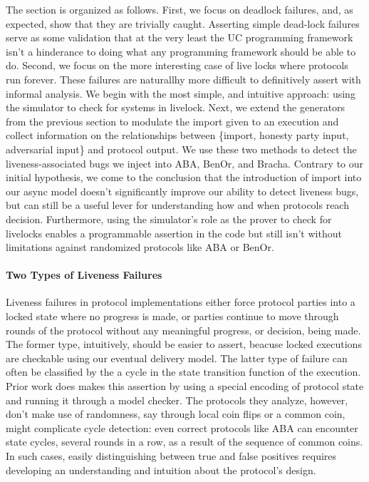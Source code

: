 The section is organized as follows.
First, we focus on deadlock failures, and, as expected, show that they are trivially caught. 
Asserting simple dead-lock failures serve as some validation that at the very least the UC programming framework isn't a hinderance to doing what any programming framework should be able to do.
Second, we focus on the more interesting case of live locks where protocols run forever.
These failures are naturallhy more difficult to definitively assert with informal analysis.
We begin with the most simple, and intuitive approach: using the simulator to check for systems in livelock.
Next, we extend the generators from the previous section to modulate the import given to an execution and collect information on the relationships between \{import, honesty party input, adversarial input\} and protocol output.
We use these two methods to detect the liveness-associated bugs we inject into ABA, BenOr, and Bracha.
Contrary to our initial hypothesis, we come to the conclusion that the introduction of import into our async model doesn't significantly improve our ability to detect liveness bugs, but can still be a useful lever for understanding how and when protocols reach decision.
Furthermore, using the simulator's role as the prover to check for livelocks enables a programmable assertion in the code but still isn't without limitations against randomized protocols like ABA or BenOr.

\paragraph{Two Types of Liveness Failures}
Liveness failures in protocol implementations either force protocol parties into a locked state where no progress is made, or parties continue to move through rounds of the protocol without any meaningful progress, or decision, being made.
The former type, intuitively, should be easier to assert, beacuse locked executions are checkable using our eventual delivery model.
The latter type of failure can often be classified by the a cycle in the state transition function of the execution.
Prior work \cite{formalbyzantine} does makes this assertion by using a special encoding of protocol state and running it through a model checker.
The protocols they analyze, however, don't make use of randomness, say through local coin flips or a common coin, might complicate cycle detection: even correct protocols like ABA can encounter state cycles, several rounds in a row, as a result of the sequence of common coins.
In such cases, easily distinguishing between true and false positives requires developing an understanding and intuition about the protocol's design.

